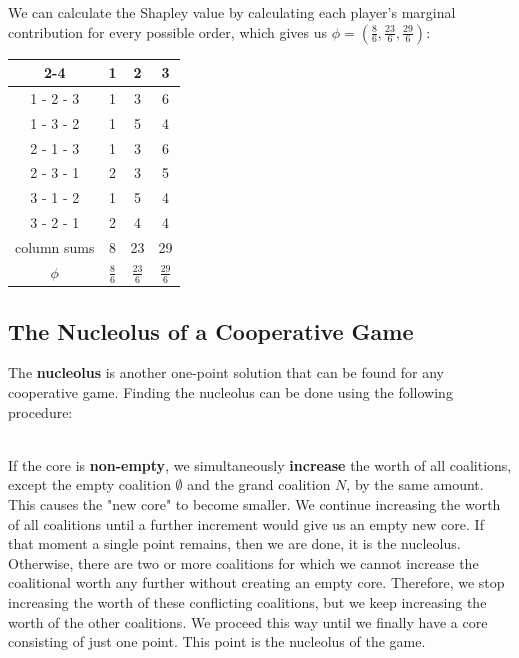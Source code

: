 \documentclass[12pt]{article}
\begin{document}
\noindent
We can calculate the Shapley value by calculating each player's marginal contribution for every possible order, which gives us $\phi = (\frac{8}{6}, \frac{23}{6}, \frac{29}{6})$:

\begin{table}[h!]
    \centering
    \begin{tabular}{c|ccc|}
    \cline{2-4}
     & 1 & 2 & 3 \\ \hline
    \multicolumn{1}{|c|}{1 - 2 - 3} & 1 & 3 & 6 \\
    \multicolumn{1}{|c|}{1 - 3 - 2} & 1 & 5 & 4 \\
    \multicolumn{1}{|c|}{2 - 1 - 3} & 1 & 3 & 6 \\
    \multicolumn{1}{|c|}{2 - 3 - 1} & 2 & 3 & 5 \\
    \multicolumn{1}{|c|}{3 - 1 - 2} & 1 & 5 & 4 \\
    \multicolumn{1}{|c|}{3 - 2 - 1} & 2 & 4 & 4 \\ \hline
    \multicolumn{1}{|c|}{column sums} & 8 & 23 & 29 \\
    \multicolumn{1}{|c|}{$\phi$} & $\frac{8}{6}$ & $\frac{23}{6}$ & $\frac{29}{6}$ \\ \hline
    \end{tabular}
\end{table}

\newpage
\subsection{The Nucleolus of a Cooperative Game}
The \textbf{nucleolus} is another one-point solution that can be found for any cooperative game.
Finding the nucleolus can be done using the following procedure:

\noindent
\\
If the core is \textbf{non-empty}, we simultaneously \textbf{increase} the worth of all coalitions, except the empty coalition $\emptyset$ and the grand coalition $N$, by the same amount.
This causes the "new core" to become smaller.
We continue increasing the worth of all coalitions until a further increment would give us an empty new core.
If that moment a single point remains, then we are done, it is the nucleolus.
Otherwise, there are two or more coalitions for which we cannot increase the coalitional worth any further without creating an empty core.
Therefore, we stop increasing the worth of these conflicting coalitions, but we keep increasing the worth of the other coalitions.
We proceed this way until we finally have a core consisting of just one point.
This point is the nucleolus of the game.
\end{document}
